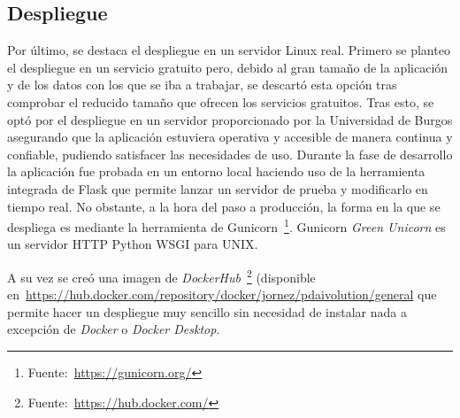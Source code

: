 \subsection{Despliegue}

Por último, se destaca el despliegue en un servidor Linux real.
Primero se planteo el despliegue en un servicio gratuito pero, debido al gran tamaño de la aplicación y de los datos con los que se iba a trabajar, se descartó esta opción tras comprobar el reducido tamaño que ofrecen los servicios gratuitos. Tras esto, se optó por el despliegue en un servidor proporcionado por la Universidad de Burgos asegurando que la aplicación estuviera operativa y accesible de manera continua y confiable, pudiendo satisfacer las necesidades de uso. 
Durante la fase de desarrollo la aplicación fue probada en un entorno local haciendo uso de la herramienta integrada de Flask que permite lanzar un servidor de prueba y modificarlo en tiempo real. No obstante, a la hora del paso a producción, la forma en la que se despliega es mediante la herramienta de Gunicorn~\footnote{Fuente:~\url{https://gunicorn.org/}}. Gunicorn \textit{Green Unicorn} es un servidor HTTP Python WSGI para UNIX.

A su vez se creó una imagen de \textit{DockerHub}~\footnote{Fuente:~\url{https://hub.docker.com/}} (disponible en~\url{https://hub.docker.com/repository/docker/jornez/pdaivolution/general} que permite hacer un despliegue muy sencillo sin necesidad de instalar nada a excepción de \textit{Docker} o \textit{Docker Desktop}.



